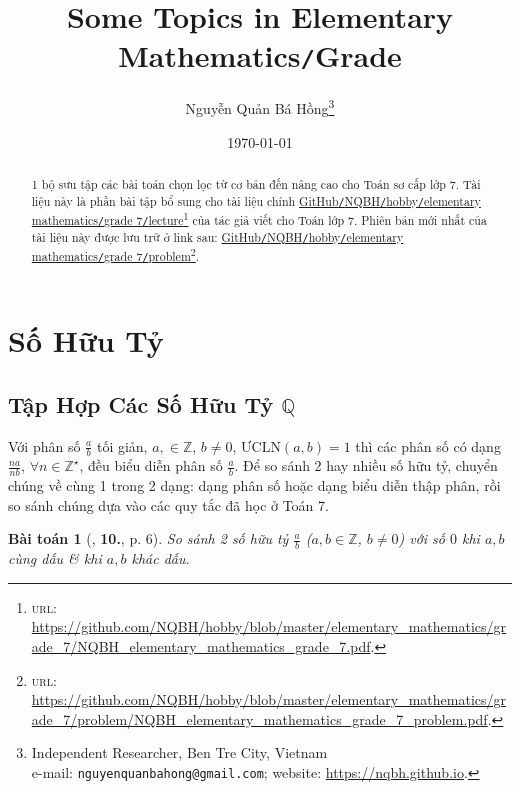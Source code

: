 \documentclass{article}
\title{Some Topics in Elementary Mathematics\texttt{/}Grade }
\author{Nguyễn Quản Bá Hồng\footnote{Independent Researcher, Ben Tre City, Vietnam\\e-mail: \texttt{nguyenquanbahong@gmail.com}; website: \url{https://nqbh.github.io}.}}
\date{\today}
\numberwithin{equation}{section}
\newtheorem{baitoan}{Bài toán}[section]
\begin{document}
\maketitle
\begin{abstract}
	1 bộ sưu tập các bài toán chọn lọc từ cơ bản đến nâng cao cho Toán sơ cấp lớp 7. Tài liệu này là phần bài tập bổ sung cho tài liệu chính \href{https://github.com/NQBH/hobby/blob/master/elementary_mathematics/grade_7/NQBH_elementary_mathematics_grade_7.pdf}{GitHub\texttt{/}NQBH\texttt{/}hobby\texttt{/}elementary mathematics\texttt{/}grade 7\texttt{/}lecture}\footnote{\textsc{url}: \url{https://github.com/NQBH/hobby/blob/master/elementary_mathematics/grade_7/NQBH_elementary_mathematics_grade_7.pdf}.} của tác giả viết cho Toán lớp 7. Phiên bản mới nhất của tài liệu này được lưu trữ ở link sau: \href{https://github.com/NQBH/hobby/blob/master/elementary_mathematics/grade_7/problem/NQBH_elementary_mathematics_grade_7_problem.pdf}{GitHub\texttt{/}NQBH\texttt{/}hobby\texttt{/}elementary mathematics\texttt{/}grade 7\texttt{/}problem}\footnote{\textsc{url}: \url{https://github.com/NQBH/hobby/blob/master/elementary_mathematics/grade_7/problem/NQBH_elementary_mathematics_grade_7_problem.pdf}.}.
\end{abstract}
\tableofcontents
\newpage


\section{Số Hữu Tỷ}

\subsection{Tập Hợp Các Số Hữu Tỷ $\mathbb{Q}$}
Với phân số $\frac{a}{b}$ tối giản, $a,\in\mathbb{Z}$, $b\ne 0$, $\mbox{ƯCLN}(a,b) = 1$ thì các phân số có dạng $\frac{na}{nb}$, $\forall n\in\mathbb{Z}^\star$, đều biểu diễn phân số $\frac{a}{b}$. Để so sánh 2 hay nhiều số hữu tỷ, chuyển chúng về cùng 1 trong 2 dạng: dạng phân số hoặc dạng biểu diễn thập phân, rồi so sánh chúng dựa vào các quy tắc đã học ở Toán 7.

\begin{baitoan}[\cite{Trong_Toan_7_2022}, \textbf{10.}, p. 6]
	So sánh 2 số hữu tỷ $\frac{a}{b}$ ($a,b\in\mathbb{Z}$, $b\ne 0$) với số $0$ khi $a,b$ cùng dấu \& khi $a,b$ khác dấu.
\end{baitoan}
\end{document}
